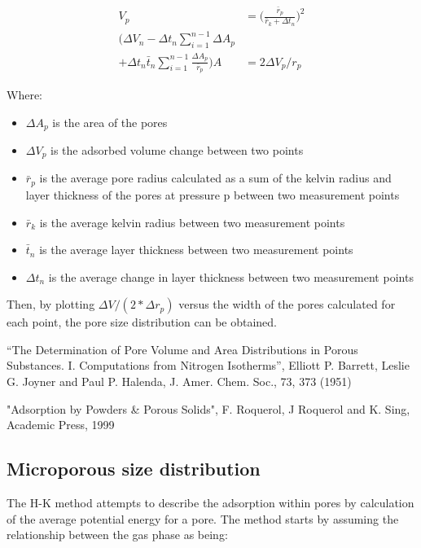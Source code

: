 \begin{align}
    V_p & = \Big( \frac{\bar{r}_p}{\bar{r}_k + \Delta t_n} \Big)^2 \\
    (\Delta V_n - \Delta t_n \sum_{i=1}^{n-1} \Delta A_p \\
    + \Delta t_n \bar{t}_n \sum_{i=1}^{n-1} \frac{\Delta A_p}{\bar{r}_p})
    A & = 2 \Delta V_p / r_p
\end{align}

Where:

\begin{itemize}
    
    \item \(\Delta A_p\) is the area of the pores
    \item \(\Delta V_p\) is the adsorbed volume change between two points
    \item \(\bar{r}_p\) is the average pore radius calculated as a sum of the
    kelvin radius and layer thickness of the pores at pressure p between two
    measurement points
    \item \(\bar{r}_k\) is the average kelvin radius between two measurement points
    \item \(\bar{t}_n\) is the average layer thickness between two measurement points
    \item \(\Delta t_n\) is the average change in layer thickness between two measurement points
    
\end{itemize}

Then, by plotting \(\Delta V / (2*\Delta r_p)\) versus the width of the pores calculated
for each point, the pore size distribution can be obtained.

“The Determination of Pore Volume and Area Distributions in Porous Substances.
   I. Computations from Nitrogen Isotherms”, Elliott P. Barrett, Leslie G. Joyner and
   Paul P. Halenda, J. Amer. Chem. Soc., 73, 373 (1951)

"Adsorption by Powders \& Porous Solids", F. Roquerol, J Roquerol
   and K. Sing, Academic Press, 1999


\subsection{Microporous size distribution}

The H-K method attempts to describe the adsorption within pores by calculation
of the average potential energy for a pore. The method starts by assuming the
relationship between the gas phase as being:

